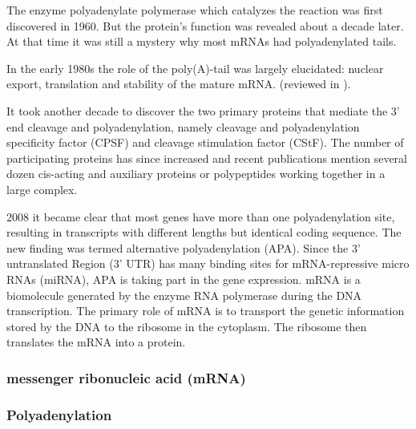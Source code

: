 The enzyme polyadenylate polymerase which catalyzes the reaction was first discovered in 1960. \cite{pmid13819354} But the protein's function was revealed about a decade later. \cite{pmid5288383} At that time it was still a mystery why most mRNAs had polyadenylated tails. 

In the early 1980s the role of the poly(A)-tail was largely elucidated: nuclear export, translation and stability of the mature mRNA. (reviewed in \cite{pmid6111419}). 

It took another decade to discover the two primary proteins that mediate the 3' end cleavage and polyadenylation, namely cleavage and polyadenylation specificity factor (CPSF) and cleavage stimulation factor (CStF). The number of participating proteins has since increased and recent publications mention several dozen cis-acting and auxiliary proteins or polypeptides working together in a large complex. \cite{pmid23774734} 

2008 it became clear that most genes have more than one polyadenylation site, resulting in transcripts with different lengths but identical coding sequence. \cite{pmid18411206} The new finding was termed alternative polyadenylation (APA). Since the 3' untranslated Region (3' UTR) has many binding sites for mRNA-repressive micro RNAs (miRNA), APA is taking part in the gene expression. \cite{pmid18566288}
mRNA is a biomolecule generated by the enzyme RNA polymerase during the DNA transcription. The primary role of mRNA is to transport the genetic information stored by the DNA to the ribosome in the cytoplasm. The ribosome then translates the mRNA into a protein. 
\subsubsection{messenger ribonucleic acid (mRNA)}
\subsubsection{Polyadenylation}

